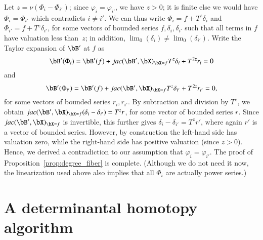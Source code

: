 \documentclass[amsthm]{elsart}
\begin{document}
Let $z=\nu(\Phi_i-\Phi_{i'})$; since $\varphi_i = \varphi_{i'}$, we
have $z > 0$; it is finite else we would have $\Phi_i=\Phi_{i'}$ which
contradicts $i\neq i'$. We can thus write $\Phi_i=f + T^z \delta_i$
and $\Phi_{i'}=f + T^z \delta_{i'}$, for some vectors of bounded
series $f, \delta_i, \delta_{i'}$ such that all terms in $f$ have
valuation less than~$z$; in addition,
$\lim_0(\delta_i) \ne \lim_0(\delta_{i'})$. Write the Taylor expansion
of $\bB'$ at $f$ as
$$\bB'(\Phi_i) = \bB'(f) + \jac(\bB',\bX)_{\bX=f} T^z \delta_i + T^{2z} r_i =0$$
and
$$\bB'(\Phi_{i'}) = \bB'(f) + \jac(\bB',\bX)_{\bX=f} T^z \delta_{i'} + T^{2z}
r_{i'} =0,$$ for some vectors of bounded series $r_i,r_{i'}$.  By
subtraction and division by $T^z$, we obtain
$\jac(\bB',\bX)_{\bX=f} (\delta_i-\delta_{i'}) = T^z r$, for some vector of
bounded series $r$.  Since $\jac(\bB',\bX)_{\bX=f}$ is invertible, this
further gives $\delta_i-\delta_{i'} = T^z r'$, where again $r'$ is a
vector of bounded series.  However, by construction the left-hand side
has valuation zero, while the right-hand side has positive valuation
(since $z > 0$). Hence, we derived a contradiction to our assumption
that $\varphi_i = \varphi_{i'}$. The proof of
Proposition~\ref{prop:degree_fiber} is complete. (Although we do not
need it now, the linearization used above also implies that all
$\Phi_i$ are actually power series.)


\section{A determinantal homotopy algorithm}\label{sec:homotalgo}
\end{document}
